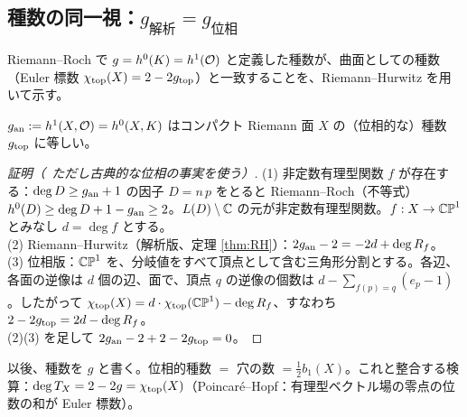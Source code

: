 \subsection{種数の同一視：$g_{\text{解析}}=g_{\text{位相}}$}
Riemann--Roch で $g=h^0(K)=h^1(\mathcal O)$ と定義した種数が、曲面としての種数（Euler 標数 $\chi_{\rm top}(X)=2-2g_{\rm top}$）と一致することを、Riemann--Hurwitz を用いて示す。
\begin{thm}\label{thm:genus}
$g_{\rm an}:=h^1(X,\mathcal O)=h^0(X,K)$ はコンパクト Riemann 面 $X$ の（位相的な）種数 $g_{\rm top}$ に等しい。
\end{thm}
\begin{proof}[証明（\tP\ ただし古典的な位相の事実を使う）]
(1) 非定数有理型関数 $f$ が存在する：$\deg D\ge g_{\rm an}+1$ の因子 $D=n\,p$ をとると Riemann--Roch（不等式）$h^0(D)\ge\deg D+1-g_{\rm an}\ge2$。$L(D)\setminus\mathbb C$ の元が非定数有理型関数。$f:X\to\mathbb{CP}^1$ とみなし $d=\deg f$ とする。\\
(2) Riemann--Hurwitz（解析版、定理 \ref{thm:RH}）：$2g_{\rm an}-2=-2d+\deg R_f$。\\
(3) 位相版：$\mathbb{CP}^1$ を、分岐値をすべて頂点として含む三角形分割とする。各辺、各面の逆像は $d$ 個の辺、面で、頂点 $q$ の逆像の個数は $d-\sum_{f(p)=q}(e_p-1)$。したがって $\chi_{\rm top}(X)=d\cdot\chi_{\rm top}(\mathbb{CP}^1)-\deg R_f$、すなわち $2-2g_{\rm top}=2d-\deg R_f$。\\
(2)(3) を足して $2g_{\rm an}-2+2-2g_{\rm top}=0$。 
\end{proof}
以後、種数を $g$ と書く。位相的種数 $=$ 穴の数 $=\frac12b_1(X)$。これと整合する検算：$\deg T_X=2-2g=\chi_{\rm top}(X)$（Poincaré--Hopf：有理型ベクトル場の零点の位数の和が Euler 標数）。

